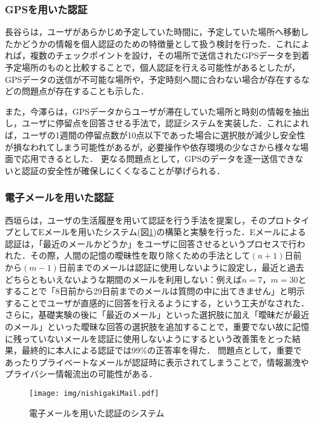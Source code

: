 \subsubsection{GPSを用いた認証}\label{subsec:gpsAuth}
長谷ら\cite{長谷容子:2004-08-20}は，ユーザがあらかじめ予定していた時間に，予定していた場所へ移動したかどうかの情報を個人認証のための特徴量として扱う検討を行った．これによれば，複数のチェックポイントを設け，その場所で送信されたGPSデータを到着予定場所のものと比較することで，個人認証を行える可能性があるとしたが，GPSデータの送信が不可能な場所や，予定時刻へ間に合わない場合が存在するなどの問題点が存在することも示した．

また，今澤ら\cite{imazawa:2008-10-08}は，GPSデータからユーザが滞在していた場所と時刻の情報を抽出し，ユーザに停留点を回答させる手法で，認証システムを実装した．これによれば，ユーザの1週間の停留点数が10点以下であった場合に選択肢が減少し安全性が損なわれてしまう可能性があるが，必要操作や依存環境の少なさから様々な場面で応用できるとした．
更なる問題点として，GPSのデータを逐一送信できないと認証の安全性が確保しにくくなることが挙げられる．

\subsubsection{電子メールを用いた認証}\label{subsec:emailAuth}
西垣ら\cite{西垣正勝:2006-03-15}は，ユーザの生活履歴を用いて認証を行う手法を提案し，そのプロトタイプとしてEメールを用いたシステム(図\ref{fig:nishigakiMail})の構築と実験を行った．Eメールによる認証は，「最近のメールかどうか」をユーザに回答させるというプロセスで行われた．その際，人間の記憶の曖昧性を取り除くための手法として$ ( n + 1 ) $日前から$ ( m - 1 ) $日前までのメールは認証に使用しないように設定し，最近と過去どちらともいえないような期間のメールを利用しない：例えば$ n = 7 $，$ m = 30 $とすることで「8日前から29日前までのメールは質問の中に出てきません」と明示することでユーザが直感的に回答を行えるようにする，という工夫がなされた．
さらに，基礎実験の後に「最近のメール」といった選択肢に加え「曖昧だが最近のメール」といった曖昧な回答の選択肢を追加することで，重要でない故に記憶に残っていないメールを認証に使用しないようにするという改善策をとった結果，最終的に本人による認証では99\%の正答率を得た．
問題点として，重要であったりプライベートなメールが認証時に表示されてしまうことで，情報漏洩やプライバシー情報流出の可能性がある．

\begin{figure}[ht]
  \begin{center}
    \texttt{[image: img/nishigakiMail.pdf]}
  \end{center}
  \caption{電子メールを用いた認証のシステム}
  \label{fig:nishigakiMail}
\end{figure}

